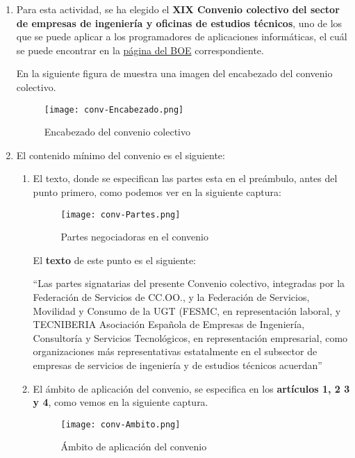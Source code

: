 \begin{enumerate}
    \item Para esta actividad, se ha elegido el \textbf{XIX Convenio colectivo del sector de empresas de ingeniería y oficinas de estudios técnicos}, uno de los que se puede aplicar a los programadores de aplicaciones informáticas, el cuál se puede encontrar en la \href{https://www.boe.es/diario_boe/txt.php?id=BOE-A-2019-14977}{página del BOE} correspondiente.

    En la siguiente figura de muestra una imagen del encabezado del convenio colectivo.

    \begin{figure}[H]
        \centering
        \texttt{[image: conv-Encabezado.png]}
        \caption{Encabezado del convenio colectivo}
    \end{figure}

    \item El contenido mínimo del convenio es el siguiente:
    \begin{enumerate}
        \item El texto, donde se especifican las partes esta en el preámbulo, antes del punto primero, como podemos ver en la siguiente captura:

        \begin{figure}[H]
            \centering
            \texttt{[image: conv-Partes.png]}
            \caption{Partes negociadoras en el convenio}
        \end{figure}

        El \textbf{texto} de este punto es el siguiente:

         ``Las partes signatarias del presente Convenio colectivo, integradas por la Federación de Servicios de CC.OO., y la Federación de Servicios, Movilidad y Consumo de la UGT (FESMC, en representación laboral, y TECNIBERIA Asociación Española de Empresas de Ingeniería, Consultoría y Servicios Tecnológicos, en representación empresarial, como organizaciones más representativas estatalmente en el subsector de empresas de servicios de ingeniería y de estudios técnicos acuerdan''

         \item El ámbito de aplicación del convenio, se especifica en los \textbf{artículos 1, 2 3 y 4}, como vemos en la siguiente captura.

          \begin{figure}[H]
             \centering
             \texttt{[image: conv-Ambito.png]}
             \caption{Ámbito de aplicación del convenio}
         \end{figure}


\end{enumerate}
\end{enumerate}
